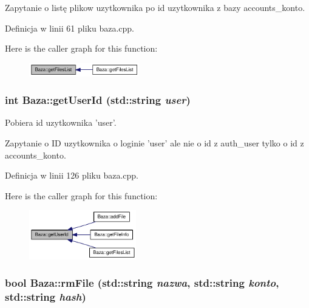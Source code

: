 Zapytanie o listę plikow uzytkownika po id uzytkownika z bazy accounts\_\-konto. 

Definicja w linii 61 pliku baza.cpp.

Here is the caller graph for this function:\nopagebreak
\begin{figure}[H]
\begin{center}
\leavevmode
\includegraphics[width=136pt]{a00001_02db3388d088212bd443ee39998b5cf8_icgraph}
\end{center}
\end{figure}
\hypertarget{a00001_65054f08c8fd7c600f6c2fe2c7f61a43}{
\subsubsection[{getUserId}]{\setlength{\rightskip}{0pt plus 5cm}int Baza::getUserId (std::string {\em user})}}
\label{a00001_65054f08c8fd7c600f6c2fe2c7f61a43}


Pobiera id uzytkownika 'user'. 

Zapytanie o ID uzytkownika o loginie 'user' ale nie o id z auth\_\-user tylko o id z accounts\_\-konto. 

Definicja w linii 126 pliku baza.cpp.

Here is the caller graph for this function:\nopagebreak
\begin{figure}[H]
\begin{center}
\leavevmode
\includegraphics[width=132pt]{a00001_65054f08c8fd7c600f6c2fe2c7f61a43_icgraph}
\end{center}
\end{figure}
\hypertarget{a00001_7161c573401166cc5f7d98ae6f335b44}{
\subsubsection[{rmFile}]{\setlength{\rightskip}{0pt plus 5cm}bool Baza::rmFile (std::string {\em nazwa}, \/  std::string {\em konto}, \/  std::string {\em hash})}}
\label{a00001_7161c573401166cc5f7d98ae6f335b44}


